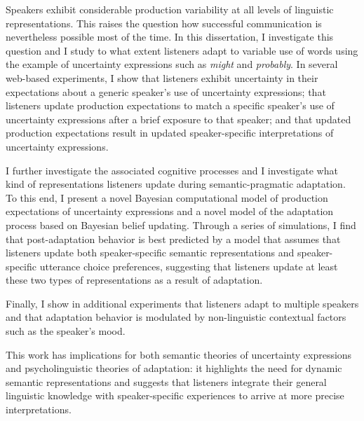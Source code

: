 Speakers exhibit considerable production variability at all levels of linguistic representations. This raises the question how successful communication is nevertheless possible most of the time.
In this dissertation, I investigate this question and I study to what extent listeners adapt to variable use of words using the example of uncertainty expressions such as \textit{might} and \textit{probably}.  In several web-based experiments, I show that listeners exhibit uncertainty in their expectations about a generic speaker's use of uncertainty expressions;  that listeners update production expectations to match a specific speaker's use of uncertainty expressions after a brief exposure to that speaker; and that updated production expectations result in updated speaker-specific interpretations of uncertainty expressions. 

I further investigate the associated cognitive processes and I investigate what kind of representations listeners update during semantic-pragmatic adaptation. To this end, I  present a novel Bayesian computational model of production expectations of uncertainty expressions and a novel model of the adaptation process based on Bayesian belief updating.  Through a series of simulations, I find that post-adaptation behavior is best predicted by a model that assumes that listeners update both speaker-specific semantic representations and speaker-specific utterance choice preferences, suggesting that listeners update at least these two types of representations as a result of adaptation. 

Finally, I show in additional experiments that listeners adapt to multiple speakers and that adaptation behavior is modulated by non-linguistic contextual factors such as the speaker's mood. 

This work has implications for both semantic theories of uncertainty expressions and psycholinguistic theories of adaptation: it highlights the need for dynamic semantic representations and suggests that listeners integrate their general linguistic knowledge with speaker-specific experiences to arrive at more precise interpretations.



